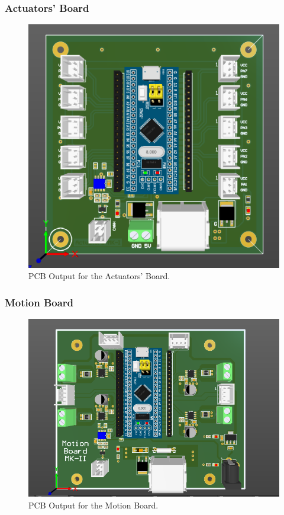 \subsubsection{Actuators' Board}
\begin{figure}[h!]
	\centering
	\includegraphics[scale=0.1]{Figures/HW/pcb-actuator.png}
	\caption{PCB Output for the Actuators' Board.}
	\label{fig:hw-servo-pcb}
\end{figure}
\newpage
\subsubsection{Motion Board}
\begin{figure}[h!]
	\centering
	\includegraphics[scale=0.1]{Figures/HW/pcb-motor-mk-ii.png}
	\caption{PCB Output for the Motion Board.}
	\label{fig:hw-motion-pcb}
\end{figure}

